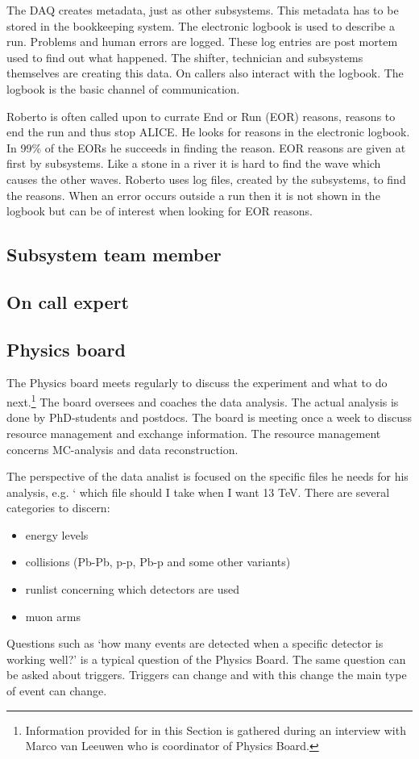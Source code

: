 The DAQ creates metadata, just as other subsystems. This metadata has to be stored in the bookkeeping system. The electronic logbook is used to describe a run. Problems and human errors are logged. These log entries are post mortem used to find out what happened. The shifter, technician and subsystems themselves are creating this data. On callers also interact with the logbook. The logbook is the basic channel of communication.


Roberto is often called upon to currate End or Run (EOR) reasons, reasons to end the run and thus stop ALICE. He looks for reasons in the electronic logbook. In 99\% of the EORs he succeeds in finding the reason. EOR reasons are given at first by subsystems. Like a stone in a river it is hard to find the wave which causes the other waves. Roberto uses log files, created by the subsystems, to find the reasons. When an error occurs outside a run then it is not shown in the logbook but can be of interest when looking for EOR reasons. 

\subsection{Subsystem team member}

\subsection{On call expert}

\subsection{Physics board}
The Physics board meets regularly to discuss the experiment and what to do next.\footnote{Information provided for in this Section is gathered during an interview with Marco van Leeuwen who is coordinator of Physics Board.} The board oversees and coaches the data analysis. The actual analysis is done by PhD-students and postdocs. The board is meeting once a week to discuss resource management and exchange information. The resource management concerns MC-analysis and data reconstruction. 

The perspective of the data analist is focused on the specific files he needs for his analysis, e.g. ` which file should I take when I want 13 TeV. There are several categories to discern:
\begin{itemize}
  \item energy levels
  \item collisions (Pb-Pb, p-p, Pb-p and some other variants)
  \item runlist concerning which detectors are used
  \item muon arms
\end{itemize}
Questions such as `how many events are detected when a specific detector is working well?' is a typical question of the Physics Board. The same question can be asked about triggers. Triggers can change and with this change the main type of event can change.

